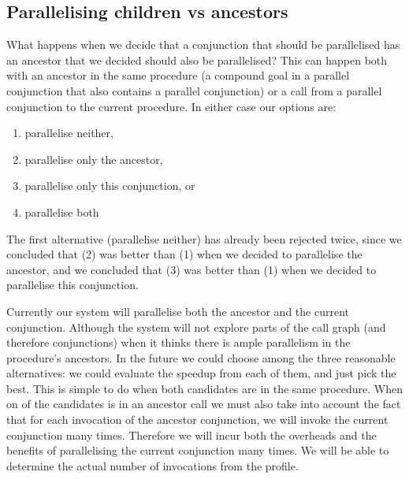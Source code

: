 \subsection{Parallelising children vs ancestors}
\label{sec:overlap_pragma_child_ancestor}

What happens when we decide that a conjunction that should be parallelised
has an ancestor that we decided should also be parallelised?
This can happen both with an ancestor in the same procedure (a compound goal
in a parallel conjunction that also contains a parallel conjunction)
or a call from a parallel conjunction to the current procedure.
In either case our options are:

\begin{enumerate}
\item parallelise neither,
\item parallelise only the ancestor,
\item parallelise only this conjunction, or
\item parallelise both
\end{enumerate}

The first alternative (parallelise neither) has already been rejected twice,
since we concluded that (2) was better than (1)
when we decided to parallelise the ancestor,
and we concluded that (3) was better than (1)
when we decided to parallelise this conjunction.

Currently our system will parallelise both the ancestor and the current
conjunction.
Although the system will not explore parts of the call graph
(and therefore conjunctions)
when it thinks there is ample parallelism in the procedure's ancestors.
In the future we could choose among the three reasonable alternatives:
we could evaluate the speedup from each of them, and just pick the best.
This is simple to do when both candidates are in the same procedure.
When on of the candidates is in an ancestor call we must also 
take into account
the fact that for each invocation of the ancestor conjunction,
we will invoke the current conjunction many times.
Therefore we will incur both the overheads and the benefits
of parallelising the current conjunction many times.
We will be able to determine the actual number of invocations from the
profile.


